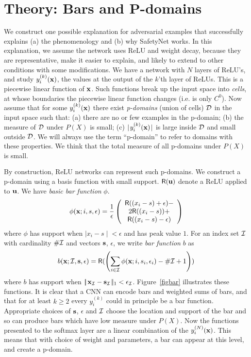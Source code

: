 \documentclass[10pt,twocolumn,letterpaper]{article}
\newcommand{\lonenorm}[1]{{\mid\!\mid\!{#1}\!\mid\!\mid_1}}
\newcommand{\vect}[1]{{\bf {#1}}}
\newcommand{\relu}[1]{{{\mathsf R}}{({{#1}})}}
\newcommand{\dafabs}[1]{{\mid\! {#1} \! \mid}}
\begin{document}
\section{Theory: Bars and P-domains}
\label{sec:label}

We construct one possible explanation for adversarial examples that successfully explains (a) the phenomenology and (b)
why SafetyNet works. In this explanation, we assume the network uses ReLU and weight decay, because they are representative, make
it easier to explain, and likely to extend to other conditions with some modifications. We have a network with $N$ layers of ReLU's, and 
study $y_i^{(k)}(\vect{x})$, the values at the output of the $k$'th layer of ReLUs.  
This is a piecewise linear function of $\vect{x}$.  Such functions break up the input space into {\em cells}, at whose boundaries  the
piecewise linear function changes (i.e. is only $C^0$).  Now assume that for some $y^{(k)}_i(\vect{x})$ there exist  {\em p-domains}
(union of cells) ${\cal D}$ in the input space such that: (a) there are no or few examples in the p-domain; (b) the
measure of ${\cal D}$ under $P(X)$ is small; (c) $\dafabs{y^{(k)}_i(\vect{x})}$ is large inside ${\cal D}$ and small
outside ${\cal D}$.  We will always use the term ``p-domain'' to refer to domains with these properties.  We think that 
the total measure of all p-domains under $P(X)$ is small.  

By construction, ReLU networks can represent such p-domains. We construct a p-domain using a basis function with small support. 
$\relu{\vect{u}}$ denote a ReLU applied to $\vect{u}$.  We have {\em basic bar function} $\phi$.
\[
\phi(\vect{x}; i, s, \epsilon)=\frac{1}{\epsilon}\left(\begin{array}{c}\relu{(x_i-s)+\epsilon}-\\2\relu{(x_i-s)}+\\\relu{(x_i-s)-\epsilon}\end{array}\right)
\]
where $\phi$ has support when $\dafabs{x_i-s}<\epsilon$ and has peak value $1$. For an index set ${\cal I}$ with cardinality $\#{\cal I}$ and vectors $\vect{s}$, $\epsilon$, we write {\em bar function} $b$ as
\[
b(\vect{x}; {\cal I}, \vect{s}, \epsilon)=\relu{\left(\sum_{i \in {\cal I}} \phi(\vect{x}; i, s_i, \epsilon_i) - \#{\cal I}+1\right)}
\]
where $b$ has support when $\lonenorm{\vect{x}_{\cal I}-\vect{s}_{\cal I}}<\epsilon_{\cal I}$. Figure~\ref{figbar} illustrates these functions.  
It is clear that a CNN can encode bars and weighted sums of bars, and that for at least $k\geq 2$ every $y_i^{(k)}$ could in principle be a bar function.  
Appropriate choices of $\vect{s}$, $\epsilon$ and ${\cal I}$ choose the location and support of the bar and so can produce bars which have low measure under $P(X)$.   
Now the functions presented to the softmax layer are a linear combination of the $y_i^{(N)}(\vect{x})$.  This means that with choice of weight and parameters, 
a bar can appear at this level, and create a p-domain.  
\end{document}
